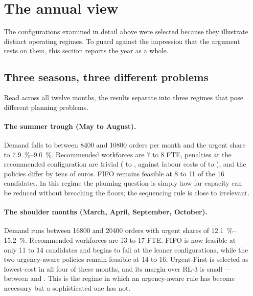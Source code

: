 \section{The annual view}
\label{sec:res-annual}

The configurations examined in detail above were selected because they illustrate distinct
operating regimes. To guard against the impression that the argument rests on them, this section
reports the year as a whole.

\subsection{Three seasons, three different problems}

Read across all twelve months, the results separate into three regimes that pose different
planning problems.

\paragraph{The summer trough (May to August).} Demand falls to between \num{8400} and
\num{10800} orders per month and the urgent share to \SIrange{7.9}{9.0}{\percent}. Recommended
workforces are 7 to 8 FTE, penalties at the recommended configuration are trivial ( to
, against labour costs of  to ), and the policies differ by tens
of euros. FIFO remains feasible
at 8 to 11 of the 16 candidates. In this regime the planning question is simply how far capacity
can be reduced without breaching the floors; the sequencing rule is close to irrelevant.

\paragraph{The shoulder months (March, April, September, October).} Demand runs between
\num{16800} and \num{20400} orders with urgent shares of \SIrange{12.1}{15.2}{\percent}.
Recommended workforces are 13 to 17 FTE. FIFO is now feasible at only 11 to 14 candidates and
begins to fail at the leaner configurations, while the two urgency-aware policies remain feasible
at 14 to 16. Urgent-First is selected as lowest-cost in all four of these months, and its margin
over RL-3 is small --- between  and . This is the regime in which an urgency-aware
rule has become necessary but a sophisticated one has not.

